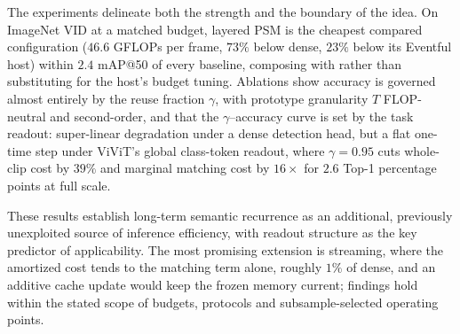 \documentclass[letterpaper]{article}
\begin{document}
The experiments delineate both the strength and the boundary of the
idea. On ImageNet VID at a matched budget, layered PSM is the cheapest
compared configuration ($46.6$ GFLOPs per frame, $73\%$ below dense,
$23\%$ below its Eventful host) within $2.4$ mAP@50 of every baseline,
composing with rather than substituting for the host's budget tuning.
Ablations show accuracy is governed almost entirely by the reuse
fraction $\gamma$, with prototype granularity $T$ FLOP-neutral and
second-order, and that the $\gamma$--accuracy curve is set by the task
readout: super-linear degradation under a dense detection head, but a
flat one-time step under ViViT's global class-token readout, where
$\gamma = 0.95$ cuts whole-clip cost by $39\%$ and marginal matching
cost by $16\times$ for $2.6$ Top-1 percentage points at full scale.

These results establish long-term semantic recurrence as an
additional, previously unexploited source of inference efficiency,
with readout structure as the key predictor of applicability. The most
promising extension is streaming, where the amortized cost tends to
the matching term alone, roughly $1\%$ of dense, and an additive cache
update would keep the frozen memory current; findings hold within the
stated scope of budgets, protocols and subsample-selected operating
points.


\end{document}
